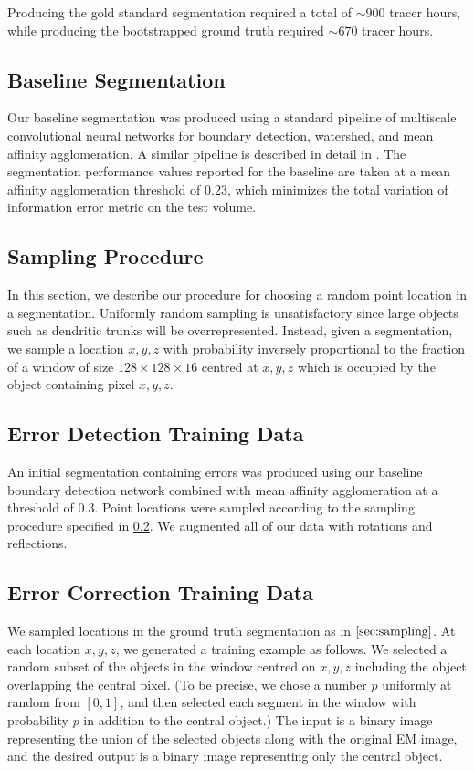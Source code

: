 \documentclass{article}
\begin{document}
Producing the gold standard segmentation required a total of $\sim900$ tracer hours, while producing the bootstrapped ground truth required $\sim 670$ tracer hours.

\subsection{Baseline Segmentation}
Our baseline segmentation was produced using a standard pipeline of multiscale convolutional neural networks for boundary detection, watershed, and mean affinity agglomeration. A similar pipeline is described in detail in  \cite{kisuk}. The segmentation performance values reported for the baseline are taken at a mean affinity agglomeration threshold of 0.23, which minimizes the total variation of information error metric on the test volume.

\subsection{Sampling Procedure}
\label{sec:sampling}
In this section, we describe our procedure for choosing a random point location in a segmentation. Uniformly random sampling is unsatisfactory since large objects such as dendritic trunks will be overrepresented. Instead, given a segmentation, we sample a location $x,y,z$ with probability inversely proportional to the fraction of a window of size $128\times 128 \times 16$ centred at $x,y,z$ which is occupied by the object containing pixel $x,y,z$.

\subsection{Error Detection Training Data}
An initial segmentation containing errors was produced using our baseline boundary detection network combined with mean affinity agglomeration at a threshold of 0.3. Point locations were sampled according to the sampling procedure specified in \ref{sec:sampling}. We augmented all of our data with rotations and reflections. 

\subsection{Error Correction Training Data}
We sampled locations in the ground truth segmentation as in $\ref{sec:sampling}$. At each location $x,y,z$, we generated a training example as follows. We selected a random subset of the objects in the window centred on $x,y,z$ including the object overlapping the central pixel. (To be precise, we chose a number $p$ uniformly at random from $[0,1]$, and then selected each segment in the window with probability $p$ in addition to the central object.) The input is a binary image representing the union of the selected objects along with the original EM image, and the desired output is a binary image representing only the central object.
\end{document}
